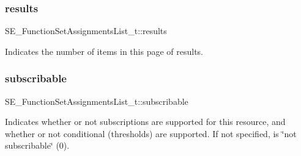 \subsubsection{\texorpdfstring{results}{results}}
{\footnotesize\ttfamily S\+E\+\_\+\+Function\+Set\+Assignments\+List\+\_\+t\+::results}

Indicates the number of items in this page of results. \mbox{\label{group__FunctionSetAssignmentsList_ga52f70232590c8b6c1b9d368bffbfa680}} 
\subsubsection{\texorpdfstring{subscribable}{subscribable}}
{\footnotesize\ttfamily S\+E\+\_\+\+Function\+Set\+Assignments\+List\+\_\+t\+::subscribable}

Indicates whether or not subscriptions are supported for this resource, and whether or not conditional (thresholds) are supported. If not specified, is \char`\"{}not subscribable\char`\"{} (0). 